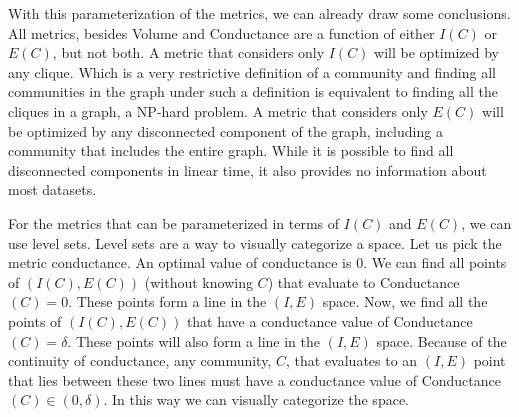 \documentclass[phd,tocprelim]{cornell}
\begin{document}
 With this parameterization of the metrics, we can already draw some conclusions.  All metrics, besides {\sc Volume} and {\sc Conductance} are a function of either $I(C)$ or $E(C)$, but not both.  A metric that considers only $I(C)$ will be optimized by any clique.  Which is a very restrictive definition of a community and finding all communities in the graph under such a definition is equivalent to finding all the cliques in a graph, a NP-hard problem.  A metric that considers only $E(C)$ will be optimized by any disconnected component of the graph, including a community that includes the entire graph.  While it is possible to find all disconnected components in linear time, it also provides no information about most datasets.

For the metrics that can be parameterized in terms of $I(C)$ and $E(C)$, we can use level sets.  Level sets are a way to visually categorize a space.  Let us pick the metric conductance.  An optimal value of conductance is $0$.  We can find all points of $(I(C), E(C))$ (without knowing $C$) that evaluate to {\sc Conductance}$(C) = 0$.  These points form a line in the $(I, E)$ space.  Now, we find all the points of $(I(C), E(C))$ that have a conductance value of {\sc Conductance}$(C) = \delta$.  These points will also form a line in the $(I, E)$ space.  Because of the continuity of conductance, any community, $C$, that evaluates to an $(I, E)$ point that lies between these two lines must have a conductance value of {\sc Conductance}$(C) \in (0, \delta)$.  In this way we can visually categorize the space.
\end{document}
